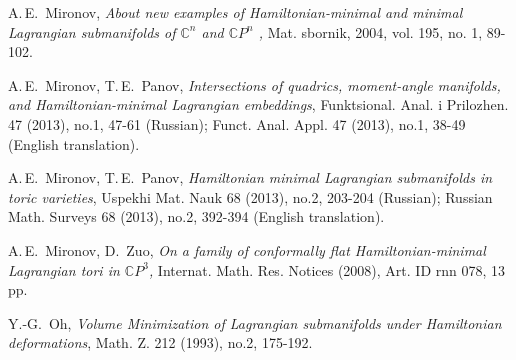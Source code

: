 \documentclass[jsg]{IP_v1_forauthors}
\theoremstyle{definition}
\numberwithin{equation}{section}
\begin{document}
\begin{thebibliography}{16}
A.\,E.~Mironov, { \it About new examples of Hamiltonian-minimal and minimal Lagrangian submanifolds of ${\mathbb C}^n$ and ${\mathbb C}P^n$ ,} Mat. sbornik, 2004,   vol. 195, no. 1, 89-102.

A.\,E.~Mironov, T.\,E.~Panov, { \it Intersections of quadrics, moment-angle manifolds, and Hamiltonian-minimal Lagrangian embeddings}, Funktsional.
Anal. i Prilozhen. 47 (2013), no.1, 47-61 (Russian); Funct. Anal. Appl. 47
(2013), no.1, 38-49 (English translation).

A.\,E.~Mironov, T.\,E.~Panov, { \it Hamiltonian minimal Lagrangian submanifolds in toric varieties}, Uspekhi Mat. Nauk 68 (2013), no.2,
203-204 (Russian); Russian Math. Surveys 68 (2013), no.2, 392-394 (English
translation).

A.\,E.~Mironov, D.~Zuo, { \it On a family of conformally flat Hamiltonian-minimal Lagrangian tori in $\mathbb{C}P^3$,}  Internat. Math. Res. Notices (2008), Art. ID rnn 078, 13 pp.

Y.-G.~Oh, { \it Volume Minimization of Lagrangian submanifolds under Hamiltonian deformations}, Math. Z. 212 (1993), no.2, 175-192.

\end{thebibliography}

\address{Lomonosov Moscow State University}


\end{document}

